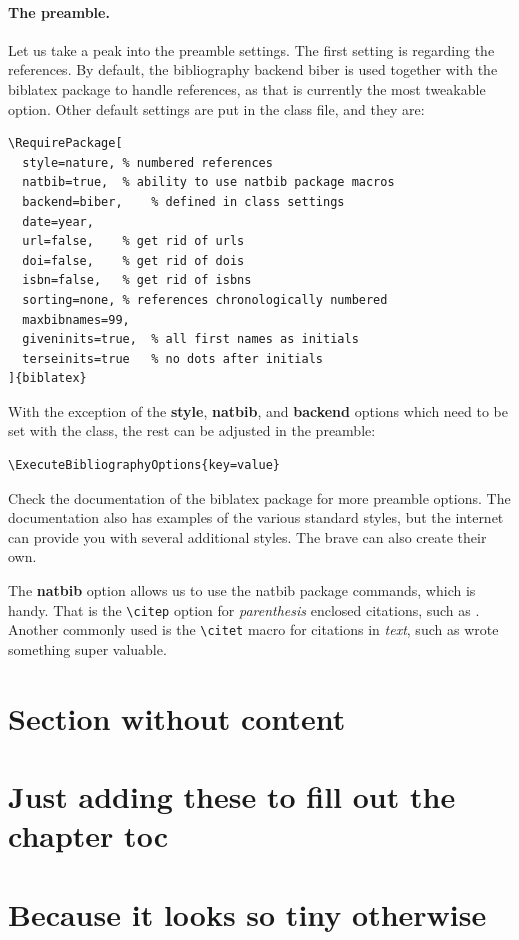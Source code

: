 \paragraph{The preamble.}
Let us take a peak into the preamble settings. The first setting is regarding the references.
By default, the bibliography backend \textsf{biber} is used together with the \textsf{biblatex} package to handle references, as that is currently the most tweakable option.
Other default settings are put in the class file, and they are:
\begin{lstlisting}
\RequirePackage[
  style=nature,	% numbered references
  natbib=true,	% ability to use natbib package macros
  backend=biber,	% defined in class settings
  date=year,
  url=false,	% get rid of urls
  doi=false,	% get rid of dois
  isbn=false,	% get rid of isbns
  sorting=none,	% references chronologically numbered
  maxbibnames=99,
  giveninits=true,	% all first names as initials
  terseinits=true	% no dots after initials
]{biblatex}
\end{lstlisting}
With the exception of the \textbf{style}, \textbf{natbib}, and \textbf{backend} options which need to be set with the class, the rest can be adjusted in the preamble:
\begin{lstlisting}
\ExecuteBibliographyOptions{key=value}
\end{lstlisting}
Check the documentation of the \textsf{biblatex} package for more preamble options.
The documentation also has examples of the various standard styles, but the internet can provide you with several additional styles.
The brave can also create their own.

The \textbf{natbib} option allows us to use the \textsf{natbib} package commands, which is handy. That is the \lstinline{\citep} option for \emph{parenthesis} enclosed citations, such as \citep{Simon1986}.
Another commonly used is the \lstinline{\citet} macro for citations in \emph{text}, such as \citet{Simon1986} wrote something super valuable.

\section{Section without content}

\section{Just adding these to fill out the chapter toc}

\section{Because it looks so tiny otherwise}
